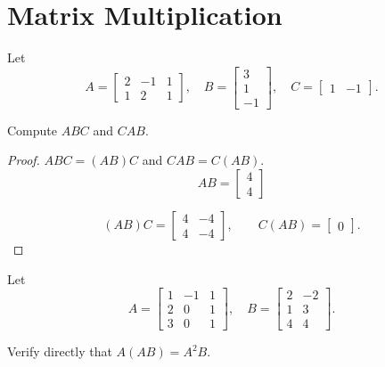 \section{Matrix Multiplication}

\setcounter{exercise}{0}

\begin{exercise}
    Let
    \[
        A = \begin{bmatrix}
            2 & -1 & 1 \\
            1 & 2  & 1
        \end{bmatrix},\quad
        B = \begin{bmatrix}
            3 \\
            1 \\
            -1
        \end{bmatrix},\quad
        C = \begin{bmatrix}
            1 & -1
        \end{bmatrix}.
    \]

    Compute $ABC$ and $CAB$.
\end{exercise}

\begin{proof}
    $ABC = (AB)C$ and $CAB = C(AB)$.
    \[
        AB = \begin{bmatrix}
            4 \\
            4
        \end{bmatrix}
    \]

    \[
        (AB)C = \begin{bmatrix}
            4 & -4 \\
            4 & -4
        \end{bmatrix},\qquad
        C(AB) = \begin{bmatrix} 0 \end{bmatrix}.
    \]
\end{proof}

\begin{exercise}
    Let
    \[
        A = \begin{bmatrix}
            1 & -1 & 1 \\
            2 & 0  & 1 \\
            3 & 0  & 1
        \end{bmatrix},\quad
        B = \begin{bmatrix}
            2 & -2 \\
            1 & 3  \\
            4 & 4
        \end{bmatrix}.
    \]

    Verify directly that $A(AB) = {A}^{2}B$.
\end{exercise}

